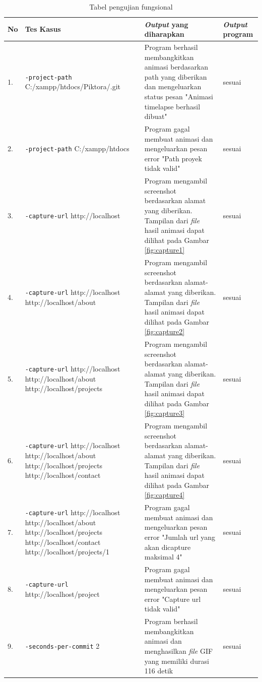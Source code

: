 \begin{table}[htbp]
	\centering
	\caption{Tabel pengujian fungsional}
	
		\begin{tabular}{|p{0.3cm}| p{5 cm}| p{7.3 cm}| p{3 cm}|} \hline
		No & Tes Kasus	& \textit{Output} yang diharapkan & \textit{Output} program \\ \hline
		1. & \texttt{-project-path} C:/xampp/htdocs/Piktora/.git & Program berhasil membangkitkan animasi berdasarkan path yang diberikan dan mengeluarkan status pesan "Animasi timelapse berhasil dibuat" & sesuai \\ \hline
		2. & \texttt{-project-path} C:/xampp/htdocs  & Program gagal membuat animasi dan mengeluarkan pesan error "Path proyek tidak valid"  & sesuai \\ \hline
		3. & \texttt{-capture-url} http://localhost & Program mengambil screenshot berdasarkan alamat yang diberikan. Tampilan dari \textit{file} hasil animasi dapat dilihat pada Gambar \ref{fig:capture1}  & sesuai	\\ \hline
		4. & \texttt{-capture-url} http://localhost http://localhost/about & Program mengambil screenshot berdasarkan alamat-alamat yang diberikan. Tampilan dari \textit{file} hasil animasi dapat dilihat pada Gambar \ref{fig:capture2}  & sesuai \\ \hline
		5. & \texttt{-capture-url} http://localhost http://localhost/about http://localhost/projects & Program mengambil screenshot berdasarkan alamat-alamat yang diberikan. Tampilan dari \textit{file} hasil animasi dapat dilihat pada Gambar \ref{fig:capture3}   & sesuai\\ \hline
		6. & \texttt{-capture-url} http://localhost http://localhost/about http://localhost/projects http://localhost/contact & Program mengambil screenshot berdasarkan alamat-alamat yang diberikan. Tampilan dari \textit{file} hasil animasi dapat dilihat pada Gambar \ref{fig:capture4}  & sesuai \\ \hline
		7. & \texttt{-capture-url} http://localhost http://localhost/about http://localhost/projects http://localhost/contact http://localhost/projects/1& Program gagal membuat animasi dan mengeluarkan pesan error "Jumlah url yang akan dicapture maksimal 4" & sesuai \\ \hline
		8. & \texttt{-capture-url} http://localhost/project& Program gagal membuat animasi dan mengeluarkan pesan error "Capture url tidak valid"  & sesuai \\ \hline
		9. & \texttt{-seconds-per-commit} 2 & Program berhasil membangkitkan animasi dan menghasilkan \textit{file} GIF yang memiliki durasi 116 detik & sesuai \\ \hline

\end{tabular}
\end{table}
